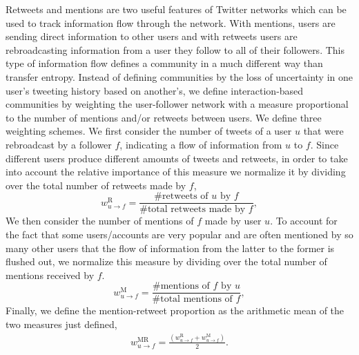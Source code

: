 Retweets and mentions are two useful features of Twitter networks which can be used to track information flow through the network.
With mentions, users are sending direct information to other users and with retweets users are rebroadcasting information from a user they follow to all of their followers.
This type of information flow defines a community in a much different way than transfer entropy. Instead of defining communities by the loss of uncertainty in one user's tweeting history based on another's, we define interaction-based communities by weighting the user-follower network with a measure proportional to the number of mentions and/or retweets between users. 
We define three weighting schemes. We first consider the number of tweets of a user $u$ that were rebroadcast by a follower $f$, indicating a flow of information from $u$ to $f$. Since different users produce different amounts of tweets and retweets, in order to take into account the relative importance of this measure we normalize it by dividing over the total number of retweets made by $f$,
\begin{equation}
w_{u \to f}^{\text{R}}=\frac{\mbox{\# retweets of }u \mbox{ by }f}{\mbox{\# total retweets made by }f},
\end{equation}
We then consider the number of mentions of $f$ made by user $u$. To account for the fact that some users/accounts are very popular and are often mentioned by so many other users that the flow of information from the latter to the former is flushed out, we normalize this measure by dividing over the total number of mentions received by $f$.
\begin{equation}
w_{u \to f}^{\text{M}} = \frac{\mbox{\# mentions of }f \mbox{ by }u}{\mbox{\# total mentions of }f},
\end{equation}
Finally, we define the mention-retweet proportion as the arithmetic mean of the two measures just defined,
\begin{align}
	w_{u \to f}^{\text{MR}} = \frac{(w_{u \to f}^{\text{R}}+w_{u \to f}^{\text{M}})}{2}. \label{Eqn-EW-interaction}
\end{align} 

